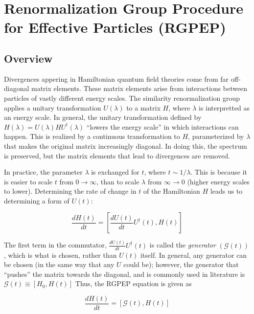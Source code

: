 \section{Renormalization Group Procedure for Effective Particles (RGPEP)}
\label{sec:rgpep}

\subsection{Overview}
Divergences appering in Hamiltonian quantum field theories come from far off-diagonal matrix elements. 
These matrix elements arise from interactions between particles of vastly different energy scales. \cite{}
The similarity renormalization group \cite{} applies a unitary transformation $U(\lambda)$ to a matrix $H$, where $\lambda$ is interpretted as an energy scale. 
In general, the unitary transformation defined by $H(\lambda) = U(\lambda)HU^\dagger(\lambda)$ ``lowers the energy scale'' in which interactions can happen. 
This is realized by a continuous transformation to $H$, parameterized by $\lambda$ that makes the original matrix increasingly diagonal. 
In doing this, the spectrum is preserved, but the matrix elements that lead to divergences are removed.

In practice, the parameter $\lambda$ is exchanged for $t$, where $t \sim 1/\lambda$. 
This is because it is easier to scale $t$ from $0 \rightarrow \infty$, than to scale $\lambda$ from $\infty \rightarrow 0$ (higher energy scales to lower).
Determining the rate of change in $t$ of the Hamiltonian $H$ leads us to determining a form of $U(t)$:

\begin{equation}
    \label{eq:rgpep-ut}
    \frac{dH(t)}{dt} = \left[\frac{dU(t)}{dt}U^\dagger(t), H(t) \right]
\end{equation}

The first term in the commutator, $\frac{dU(t)}{dt}U^\dagger(t)$ is called the \textit{generator} $\left(\mathcal{G}(t) \right)$, which is what is chosen, rather than $U(t)$ itself.
In general, any generator can be chosen (in the same way that any $U$ could be); however, the generator that ``pushes'' the matrix towards the diagonal, and is commonly used in literature is $\mathcal{G}(t) \equiv \left[H_0, H(t) \right]$
Thus, the RGPEP equation is given as 

\begin{equation}
    \label{eq:rgpep}
    \frac{dH(t)}{dt} = \left[\mathcal{G}(t), H(t) \right]
\end{equation}

